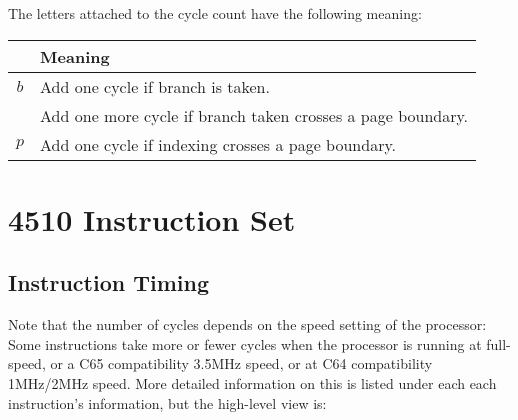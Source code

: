 The letters attached to the cycle count have the following meaning:

\begin{center}
  \begin{tabular}{|p{2em}|l|}
  \cline{1-2}
  & {\bf Meaning} \\\hline
\multicolumn{1}{|c|}{$b$} & Add one cycle if branch is taken. \\
                          & Add one more cycle if branch taken crosses a page boundary. \\\hline
\multicolumn{1}{|c|}{$p$} & Add one cycle if indexing crosses a page boundary. \\\hline
  \end{tabular}
\end{center}





\clearpage
\section{4510 Instruction Set}

\subsection{Instruction Timing}

Note that the number of cycles depends on the speed setting of the
processor: Some instructions take more or fewer cycles when the
processor is running at full-speed, or a C65 compatibility 3.5MHz speed,
or at C64 compatibility 1MHz/2MHz speed.  More detailed information on
this is listed under each each instruction's information, but the high-level
view is:

